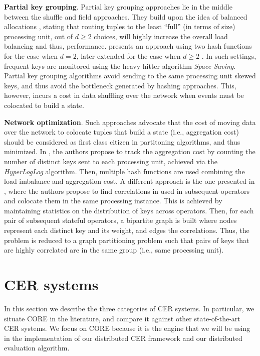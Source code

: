\textbf{Partial key grouping}. Partial key grouping approaches lie in the middle between the shuffle and field approaches. They build upon the idea of balanced allocations \cite{DBLP:journals/siamcomp/AzarBKU99}, stating that routing tuples to the least ``full'' (in terms of size) processing unit, out of $d \geq 2$ choices, will highly increase the overall load balancing and thus, performance. \cite{DBLP:conf/icde/NasirMGKS15} presents an approach using two hash functions for the case when $d = 2$, later extended for the case when $d \geq 2$ \cite{load-balancing-2}. In such settings, frequent keys are monitored using the heavy hitter algorithm \textit{Space Saving}. Partial key grouping algorithms avoid sending to the same processing unit skewed keys, and thus avoid the bottleneck generated by hashing approaches. This, however, incurs a cost in data shuffling over the network when events must be colocated to build a state.

\textbf{Network optimization}. Such approaches advocate that the cost of moving data over the network to colocate tuples that build a state (i.e., aggregation cost) should be considered as first class citizen in partitoning algorithms, and thus minimized. In \cite{DBLP:journals/pvldb/KatsipoulakisLC17}, the authors propose to track the aggregation cost by counting the number of distinct keys sent to each processing unit, achieved via the \textit{HyperLogLog} algorithm. Then, multiple hash functions are used combining the load imbalance and aggregation cost. A different approach is the one presented in \cite{DBLP:conf/middleware/CaneillELP16}, where the authors propose to find correlations in used in subsequent operators and colocate them in the same processing instance. This is achieved by maintaining statistics on the distribution of keys across operators. Then, for each pair of subsequent stateful operators, a bipartite graph is built where nodes represent each distinct key and its weight, and edges the correlations. Thus, the problem is reduced to a graph partitioning problem such that pairs of keys that are highly correlated are in the same group (i.e., same processing unit).

\section{CER systems}\label{sec:cer-systems}

In this section we describe the three categories of CER systems. In particular, we situate CORE in the literature, and compare it against other state-of-the-art CER systems. We focus on CORE because it is the engine that we will be using in the implementation of our distributed CER framework and our distributed evaluation algorithm.

